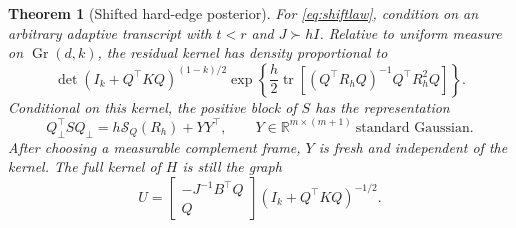 \documentclass[11pt]{article}
\newtheorem{theorem}{Theorem}[section]
\theoremstyle{definition}
\newcommand{\R}{\mathbb R}
\newcommand{\tr}{\operatorname{tr}}
\newcommand{\Gr}{\operatorname{Gr}}
\begin{document}
\begin{theorem}[Shifted hard-edge posterior]\label{thm:posterior}
For \eqref{eq:shiftlaw}, condition on an arbitrary adaptive transcript with $t<r$ and $J\succ hI$. Relative to uniform measure on $\Gr(d,k)$, the residual kernel has density proportional to
\begin{equation}\label{eq:postdensity}
\det(I_k+Q^\top KQ)^{(1-k)/2}
\exp\left\{\frac h2\tr\left[(Q^\top R_hQ)^{-1}Q^\top R_h^2Q\right]\right\}.
\end{equation}
Conditional on this kernel, the positive block of $S$ has the representation
\begin{equation}\label{eq:postS}
Q_\perp^\top SQ_\perp=h\mathcal S_Q(R_h)+YY^\top,
\qquad Y\in\R^{m\times(m+1)}\ \text{standard Gaussian}.
\end{equation}
After choosing a measurable complement frame, $Y$ is fresh and independent of the kernel. The full kernel of $H$ is still the graph
\begin{equation}\label{eq:fullkernel}
U=\begin{bmatrix}-J^{-1}B^\top Q\\Q\end{bmatrix}
(I_k+Q^\top KQ)^{-1/2}.
\end{equation}
\end{theorem}
\end{document}
